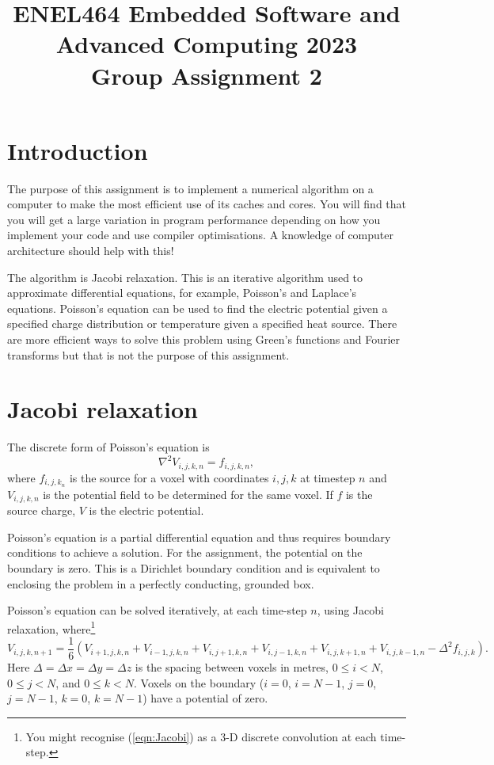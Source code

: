 \documentclass[a4paper,11pt]{article}
\begin{document}
\title{ \bf ENEL464 Embedded Software and Advanced Computing 2023 \\ Group Assignment 2}
\author{}
\date{}
\maketitle


\section{Introduction}

The purpose of this assignment is to implement a numerical algorithm
on a computer to make the most efficient use of its caches and cores.
You will find that you will get a large variation in program
performance depending on how you implement your code and use compiler
optimisations.  A knowledge of computer architecture should help with
this!

The algorithm is Jacobi relaxation.  This is an iterative algorithm
used to approximate differential equations, for example, Poisson's and
Laplace's equations.  Poisson's equation can be used to find the
electric potential given a specified charge distribution or
temperature given a specified heat source.  There are more efficient
ways to solve this problem using Green's functions and Fourier
transforms but that is not the purpose of this assignment.

\section{Jacobi relaxation}

The discrete form of Poisson's equation is
%
\begin{equation}
  \nabla^2 V_{i,j,k,n} = f_{i,j,k,n},
\end{equation}
%
where $f_{i,j,k_n}$ is the source for a voxel with coordinates $i,j,k$
at timestep $n$ and $V_{i,j,k,n}$ is the potential field to be
determined for the same voxel.  If $f$ is the source charge, $V$ is
the electric potential.

Poisson's equation is a partial differential equation and thus
requires boundary conditions to achieve a solution.  For the
assignment, the potential on the boundary is zero.  This is a
Dirichlet boundary condition and is equivalent to enclosing the
problem in a perfectly conducting, grounded box.

Poisson's equation can be solved iteratively, at each time-step $n$,
using Jacobi relaxation, where\footnote{You might recognise
  (\ref{eqn:Jacobi}) as a 3-D discrete convolution at each time-step.}
%
\begin{equation}
  V_{i,j,k,n+1} = \frac{1}{6} \left(V_{i+1,j,k,n} + V_{i-1,j,k,n} + V_{i,j+1,k,n} + V_{i,j-1,k,n} + V_{i,j,k+1,n} + V_{i,j,k-1,n} - \Delta^2 f_{i,j,k}\right).
\label{eqn:Jacobi}
\end{equation}
%
Here $\Delta = \Delta x = \Delta y = \Delta z$ is the spacing between
voxels in metres, $0 \le i < N$, $0 \le j < N$, and $0 \le k <
N$. Voxels on the boundary ($i = 0$, $i=N-1$, $j = 0$, $j=N-1$, $k =
0$, $k=N-1$) have a potential of zero.
\end{document}
